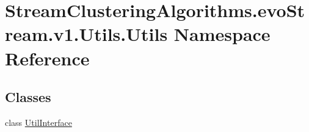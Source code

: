 \hypertarget{namespaceStreamClusteringAlgorithms_1_1evoStream_1_1v1_1_1Utils_1_1Utils}{}\section{Stream\+Clustering\+Algorithms.\+evo\+Stream.\+v1.\+Utils.\+Utils Namespace Reference}
\label{namespaceStreamClusteringAlgorithms_1_1evoStream_1_1v1_1_1Utils_1_1Utils}
\subsection*{Classes}
\begin{DoxyCompactItemize}
\item 
class \hyperlink{classStreamClusteringAlgorithms_1_1evoStream_1_1v1_1_1Utils_1_1Utils_1_1UtilInterface}{Util\+Interface}
\end{DoxyCompactItemize}
